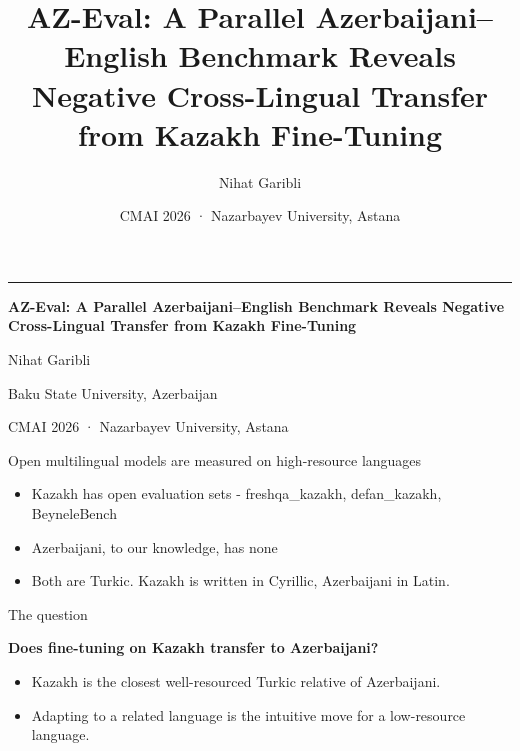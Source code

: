 \documentclass[aspectratio=169,12pt]{beamer}
\title{AZ-Eval: A Parallel Azerbaijani–English Benchmark Reveals Negative Cross-Lingual Transfer from Kazakh Fine-Tuning}
\author{Nihat Garibli}
\institute{Baku State University, Azerbaijan}
\date{CMAI 2026 · Nazarbayev University, Astana}
\begin{document}
\begin{frame}[plain]
  \vspace{1.4cm}
  \hspace*{0.02\textwidth}\textcolor{accent}{\rule{0.22\textwidth}{4pt}}\par
  \vspace{0.55cm}
  \hspace*{0.02\textwidth}\parbox{0.95\textwidth}{\raggedright
    {\LARGE\bfseries\color{ink} AZ-Eval: A Parallel Azerbaijani–English Benchmark Reveals Negative Cross-Lingual Transfer from Kazakh Fine-Tuning}\par
    \vspace{0.85cm}
    {\large\color{inksoft} Nihat Garibli}\par
    \vspace{0.12cm}
    {\color{inksoft} Baku State University, Azerbaijan}\par
    \vspace{1.1cm}
    {\small\color{muted} CMAI 2026 · Nazarbayev University, Astana}
  }
\end{frame}

\begin{frame}{Open multilingual models are measured on high-resource languages}
\begin{itemize}
  \item[] Kazakh has open evaluation sets - freshqa\_kazakh, defan\_kazakh, BeyneleBench
  \item[] Azerbaijani, to our knowledge, has none
\vspace{0.25cm}
  \item[] Both are Turkic. Kazakh is written in Cyrillic, Azerbaijani in Latin.
\end{itemize}
\end{frame}

\begin{frame}{The question}
\begin{center}{\large\bfseries Does fine-tuning on Kazakh transfer to Azerbaijani?}\end{center}
\vspace{0.3cm}
\begin{itemize}
\vspace{0.25cm}
  \item[] Kazakh is the closest well-resourced Turkic relative of Azerbaijani.
  \item[] Adapting to a related language is the intuitive move for a low-resource language.
\end{itemize}
\end{frame}
\end{document}
